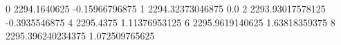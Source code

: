 0 2294.1640625 -0.15966796875
1 2294.32373046875 0.0
2 2293.93017578125 -0.3935546875
4 2295.4375 1.11376953125
6 2295.9619140625 1.63818359375
8 2295.396240234375 1.072509765625

